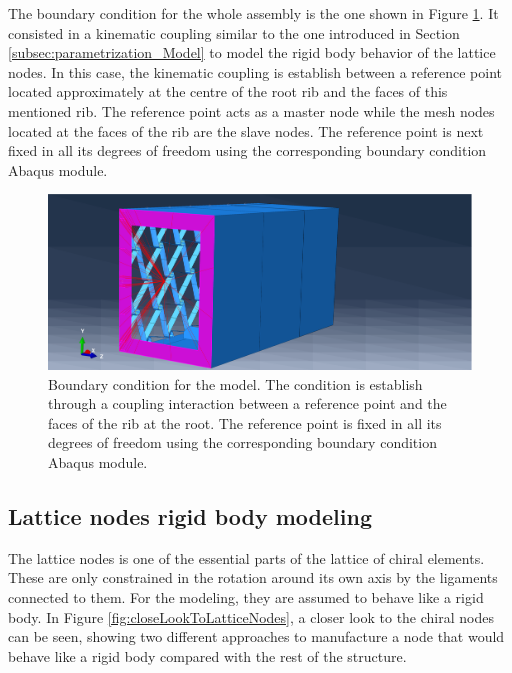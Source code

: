     The boundary condition for the whole assembly is the one shown in Figure \ref{fig:fixed}. It consisted in a kinematic coupling similar to the one introduced in Section \ref{subsec:parametrization_Model} to model the rigid body behavior of the lattice nodes. In this case, the kinematic coupling is establish between a reference point located approximately at the centre of the root rib and the faces of this mentioned rib. The reference point acts as a master node while the mesh nodes located at the faces of the rib are the slave nodes. The reference point is next fixed in all its degrees of freedom using the corresponding boundary condition Abaqus module.

    \begin{figure}[!htpb]
      \centering
      \includegraphics[width=0.8 \textwidth]{figures/result-model/fixed}
      \caption[Boundary condition for the model]{Boundary condition for the model. The condition is establish through a coupling interaction between a reference point and the faces of the rib at the root. The reference point is fixed in all its degrees of freedom using the corresponding boundary condition Abaqus module.}\label{fig:fixed}
    \end{figure}

  \clearpage
  \subsection{Lattice nodes rigid body modeling} \label{subsec:latticeNodesRigid_Parametrization}

    The lattice nodes is one of the essential parts of the lattice of chiral elements. These are only constrained in the rotation around its own axis by the ligaments connected to them. For the modeling, they are assumed to behave like a rigid body. In Figure \ref{fig:closeLookToLatticeNodes}, a closer look to the chiral nodes can be seen, showing two different approaches to manufacture a node that would behave like a rigid body compared with the rest of the structure.

